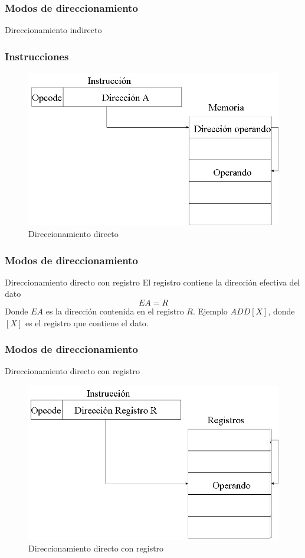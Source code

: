 \documentclass{beamer}
\begin{document}
\begin{frame}
	\frametitle{Modos de direccionamiento}
	\begin{block}{Direccionamiento indirecto}
	\frametitle{Instrucciones}
	\begin{figure}[H]
	\centering
	\includegraphics[scale=0.4]{imagenes/indirecto.jpg}
	\caption{Direccionamiento directo}
	\end{figure}			
	\end{block}		 		
\end{frame}

\begin{frame}
	\frametitle{Modos de direccionamiento}
	\begin{block}{Direccionamiento directo con registro}
		El registro contiene la dirección efectiva del dato
		\begin{equation}
			EA = R
		\end{equation}
		Donde $EA$ es la dirección contenida en el registro $R$. Ejemplo $ADD [X]$, donde $[X]$ es el registro que contiene el dato.				
	\end{block}		 		
\end{frame}

\begin{frame}
	\frametitle{Modos de direccionamiento}
	\begin{block}{Direccionamiento directo con registro}
	\begin{figure}[H]
	\centering
	\includegraphics[scale=0.4]{imagenes/directoRegistro.jpg}
	\caption{Direccionamiento directo con registro}
	\end{figure}			
	\end{block}		 		
\end{frame}
\end{document}
